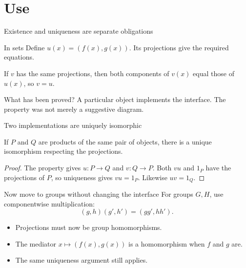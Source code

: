 \documentclass[10pt,aspectratio=43]{beamer}
\begin{document}
\section{Use}
\begin{frame}{Existence and uniqueness are separate obligations}
\begin{exampleblock}{In sets}
Define $u(x)=(f(x),g(x))$. Its projections give the required equations.
\end{exampleblock}
\pause
If $v$ has the same projections, then both components of $v(x)$ equal those of $u(x)$, so $v=u$.
\begin{alertblock}{What has been proved?}
A particular object implements the interface. The property was not merely a suggestive diagram.
\end{alertblock}
\end{frame}
\begin{frame}{Two implementations are uniquely isomorphic}
\begin{theorem}
If $P$ and $Q$ are products of the same pair of objects, there is a unique isomorphism respecting the projections.
\end{theorem}
\begin{proof}
The property gives $u:P\to Q$ and $v:Q\to P$. Both $vu$ and $1_P$ have the projections of $P$, so uniqueness gives $vu=1_P$. Likewise $uv=1_Q$.
\end{proof}
\end{frame}
\begin{frame}{Now move to groups without changing the interface}
For groups $G,H$, use componentwise multiplication:
\[
 (g,h)(g',h')=(gg',hh').
\]
\begin{itemize}
\item Projections must now be group homomorphisms.
\item The mediator $x\mapsto(f(x),g(x))$ is a homomorphism when $f$ and $g$ are.
\item The same uniqueness argument still applies.
\end{itemize}
\end{frame}
\end{document}

